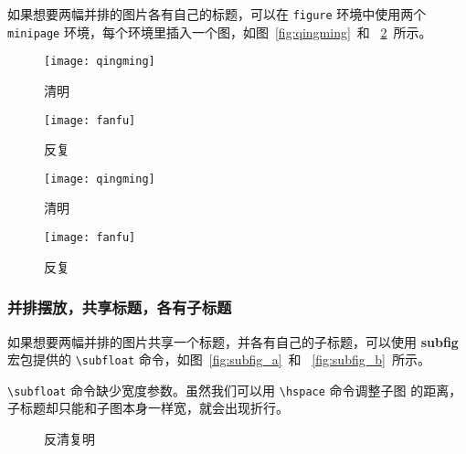 如果想要两幅并排的图片各有自己的标题，可以在 \texttt{figure} 环境中使用两个
 \texttt{minipage} 环境，每个环境里插入一个图，如图~\ref{fig:qingming}~和
~\ref{fig:fanfu}~所示。

\begin{code}
\begin{figure}[htbp]
\centering
\begin{minipage}[t]{0.3\textwidth}
    \centering
    \texttt{[image: qingming]}
    \caption{清明}
    \label{fig:qingming}
\end{minipage}
\hspace{36pt}
\begin{minipage}[t]{0.3\textwidth}
    \centering
    \texttt{[image: fanfu]}
    \caption{反复}
    \label{fig:fanfu}
\end{minipage}
\end{figure}
\end{code}

\begin{figure}[htbp]
\centering
\begin{minipage}[t]{0.3\textwidth}
    \centering
    \texttt{[image: qingming]}
    \caption{清明}
    \label{fig:qingming}
\end{minipage}
\hspace{36pt}
\begin{minipage}[t]{0.3\textwidth}
    \centering
    \texttt{[image: fanfu]}
    \caption{反复}
    \label{fig:fanfu}
\end{minipage}
\end{figure}

\subsubsection*{并排摆放，共享标题，各有子标题}

如果想要两幅并排的图片共享一个标题，并各有自己的子标题，可以使用
\textbf{subfig} 宏包提供的 \verb|\subfloat| 命令，如图~\ref{fig:subfig_a}~和
~\ref{fig:subfig_b}~所示。

\verb|\subfloat| 命令缺少宽度参数。虽然我们可以用 \verb|\hspace| 命令调整子图
的距离，子标题却只能和子图本身一样宽，就会出现折行。

\begin{code}
\begin{figure}[htbp]
\centering
{}
\hspace{36pt}
\caption{反清复明}
\end{figure}
\end{code}

